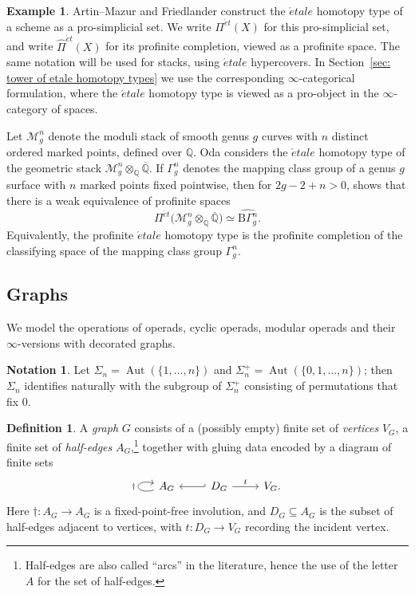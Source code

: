 \documentclass{amsart}
\newcommand{\calM}{\mathcal{M}}
\newcommand{\cs}{\mathrm{B}}
\newcommand{\Aut}{\operatorname{Aut}}
\theoremstyle{definition}
\newtheorem{definition}[theorem]{Definition}%
\newtheorem{example}[theorem]{Example}%
\newtheorem{notation}[theorem]{Notation}
\numberwithin{equation}{section}
\begin{document}
\begin{example}\label{example: Oda}
Artin--Mazur \cite{Artin_Mazur} and Friedlander \cite{Friedlander}
construct the $\acute etale$ homotopy type of a scheme as a pro-simplicial
set.  We write $\Pi^{\acute et}(X)$
for this pro-simplicial set, and write $\widehat{\Pi}^{\acute et}(X)$  for its profinite completion, viewed as a profinite space.  The same notation
will be used for stacks, using $\acute etale$ hypercovers.  In Section~\ref{sec: tower of etale homotopy types} we use the corresponding $\infty$-categorical formulation, where the $\acute etale$ homotopy type is viewed as a pro-object in the $\infty$-category of spaces.

Let $\calM_g^n$ denote the moduli stack of smooth genus $g$ curves with $n$ distinct ordered marked points, defined over $\mathbb Q$.  Oda considers the $\acute etale$ homotopy type of the geometric stack
$\calM_g^n\otimes_{\mathbb Q}\overline{\mathbb Q}$.  If $\Gamma_g^n$ denotes the mapping class group of a genus $g$ surface with $n$ marked points fixed pointwise, then for $2g-2+n>0$,  \cite[Theorem 1]{Oda} shows that there is a weak equivalence of profinite spaces
\[
\Pi^{\acute et}
  \bigl(\calM_g^n\otimes_{\mathbb Q}\overline{\mathbb Q}\bigr)
\simeq
\widehat{\cs\Gamma_g^n}.
\]
Equivalently, the profinite $\acute etale$ homotopy type is the profinite completion of the classifying space of the mapping class group $\Gamma_g^n$.
\end{example}


\subsection{Graphs} We model the operations of operads, cyclic operads, modular operads and their $\infty$-versions with decorated graphs. 

\begin{notation}
Let $\Sigma_n=\Aut(\{1,\ldots,n\})$ and $\Sigma_n^+=\Aut(\{0,1,\ldots,n\})$; then $\Sigma_n$ identifies naturally with the subgroup of $\Sigma_n^+$ consisting of permutations that fix $0$.
\end{notation}


\begin{definition}\label{def: graph}
A \emph{graph} $G$ consists of a (possibly empty) finite set of \emph{vertices} $V_G$, a finite set of \emph{half-edges} $A_G$,\footnote{Half-edges are also called ``arcs'' in the literature, hence the use of the letter $A$ for the set of half-edges.} together with gluing data encoded by a diagram of finite sets
\[
\begin{tikzcd}
\arrow[loop left]{l}{\dagger} A_G & D_G \arrow[l,hook'] \arrow[r,"t"] & V_G .
\end{tikzcd}
\] Here $\dagger:A_G\to A_G$ is a fixed-point-free involution, and $D_G\subseteq A_G$ is the subset of half-edges adjacent to vertices, with $t:D_G\to V_G$ recording the incident vertex.
\end{definition}
\end{document}
